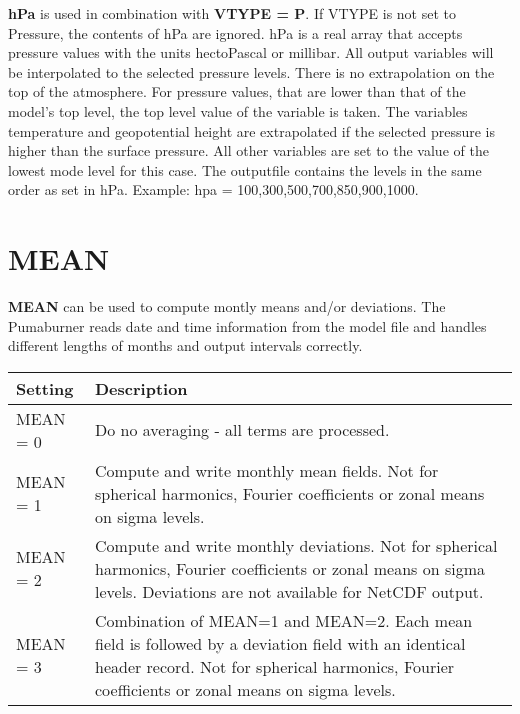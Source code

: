 {\bf hPa} is used in combination with {\bf VTYPE = P}.
If VTYPE is not set to Pressure, the contents of hPa are ignored.
hPa is a real array that accepts pressure values with the
units hectoPascal or millibar. All output variables will be
interpolated to the selected pressure levels.
There is no extrapolation on the top of the atmosphere.
For pressure values, that are lower than that of the model's
top level, the top level value of the variable is taken.
The variables temperature and geopotential height are extrapolated
if the selected pressure is higher than the surface pressure.
All other variables are set to the value of the lowest mode level
for this case. The outputfile contains the levels in the same order
as set in hPa. Example: hpa = 100,300,500,700,850,900,1000.

\section{MEAN}

{\bf MEAN} can be used to compute montly means and/or deviations.
The Pumaburner reads date and time information from the model file
and handles different lengths of months and output intervals correctly.

\begin{tabular}{|l|p{12cm}|}
\hline
Setting & Description \\
\hline
        MEAN  =  0 & Do no averaging - all terms are processed. \\

        MEAN  =  1 & Compute and write monthly mean fields.
                     Not for spherical harmonics, Fourier coefficients or
                     zonal means on sigma levels. \\

        MEAN  =  2 & Compute and write monthly deviations.
                     Not for spherical harmonics, Fourier coefficients or
                     zonal means on sigma levels.
                     Deviations are not available for NetCDF output. \\

        MEAN  =  3 & Combination of MEAN=1 and MEAN=2.
                     Each mean field is followed by a deviation
                     field with an identical header record.
                     Not for spherical harmonics, Fourier coefficients or
                     zonal means on sigma levels. \\
\hline
\end{tabular}

